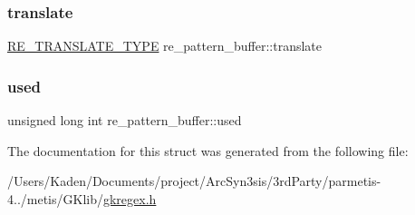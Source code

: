 \mbox{\label{a00686_a780f81d1ec1ebba869e138b5bc849658}} 
\subsubsection{\texorpdfstring{translate}{translate}}
{\footnotesize\ttfamily \hyperlink{a00092_a96c9fb9c7074cb21740b63092b0637a4}{R\+E\+\_\+\+T\+R\+A\+N\+S\+L\+A\+T\+E\+\_\+\+T\+Y\+PE} re\+\_\+pattern\+\_\+buffer\+::translate}

\mbox{\label{a00686_a5c6bb086f4bfebee8aa4373c03bcc74b}} 
\subsubsection{\texorpdfstring{used}{used}}
{\footnotesize\ttfamily unsigned long int re\+\_\+pattern\+\_\+buffer\+::used}



The documentation for this struct was generated from the following file\+:\begin{DoxyCompactItemize}
\item 
/\+Users/\+Kaden/\+Documents/project/\+Arc\+Syn3sis/3rd\+Party/parmetis-\/4../metis/\+G\+Klib/\hyperlink{a00092}{gkregex.\+h}\end{DoxyCompactItemize}
